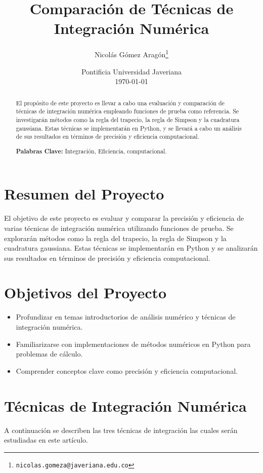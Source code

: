 \documentclass[a4paper]{article}
\title{Comparación de Técnicas de Integración Numérica}
\author{Nicolás Gómez Aragón\thanks{\texttt{nicolas.gomeza@javeriana.edu.co}}}
\date{Pontificia Universidad Javeriana\\\vspace{0.5cm}\today}
\begin{document}
	\maketitle
	
	\begin{abstract}
		El propósito de este proyecto es llevar a cabo una evaluación y comparación de técnicas de integración numérica empleando funciones de prueba como referencia. Se investigarán métodos como la regla del trapecio, la regla de Simpson y la cuadratura gaussiana. Estas técnicas se implementarán en Python, y se llevará a cabo un análisis de sus resultados en términos de precisión y eficiencia computacional.
	
		\noindent\textbf{Palabras Clave:} Integración, Eficiencia, computacional.
	\end{abstract}

	\tableofcontents
	
	\section{Resumen del Proyecto}
	\label{sec:resumen}
	
	El objetivo de este proyecto es evaluar y comparar la precisión y eficiencia de varias técnicas de integración numérica utilizando funciones de prueba. Se explorarán métodos como la regla del trapecio, la regla de Simpson y la cuadratura gaussiana. Estas técnicas se implementarán en Python y se analizarán sus resultados en términos de precisión y eficiencia computacional.
	
	\section{Objetivos del Proyecto}
	\label{sec:objetivos}
	\begin{itemize}
		\item Profundizar en temas introductorios de análisis numérico y técnicas de integración numérica.
		\item Familiarizarse con implementaciones de métodos numéricos en Python para problemas de cálculo.
		\item Comprender conceptos clave como precisión y eficiencia computacional.
	\end{itemize}


	\section{Técnicas de Integración Numérica}
	\label{sec:tecnicas}
    A continuación se describen las tres técnicas de integración las cuales serán estudiadas en  este artículo.
\end{document}
